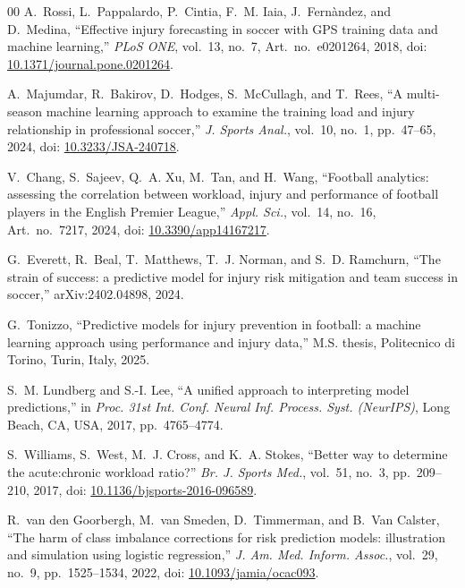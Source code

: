 \documentclass[conference]{IEEEtran}
\newcommand{\doilink}[1]{doi: \href{https://doi.org/#1}{#1}}
\begin{document}
\begin{thebibliography}{00}
A.~Rossi, L.~Pappalardo, P.~Cintia, F.~M. Iaia, J.~Fernàndez, and D.~Medina, ``Effective injury forecasting in soccer with GPS training data and machine learning,'' \textit{PLoS ONE}, vol.~13, no.~7, Art.~no.~e0201264, 2018, \doilink{10.1371/journal.pone.0201264}.

A.~Majumdar, R.~Bakirov, D.~Hodges, S.~McCullagh, and T.~Rees, ``A multi-season machine learning approach to examine the training load and injury relationship in professional soccer,'' \textit{J. Sports Anal.}, vol.~10, no.~1, pp.~47--65, 2024, \doilink{10.3233/JSA-240718}.

V.~Chang, S.~Sajeev, Q.~A. Xu, M.~Tan, and H.~Wang, ``Football analytics: assessing the correlation between workload, injury and performance of football players in the English Premier League,'' \textit{Appl. Sci.}, vol.~14, no.~16, Art.~no.~7217, 2024, \doilink{10.3390/app14167217}.

G.~Everett, R.~Beal, T.~Matthews, T.~J. Norman, and S.~D. Ramchurn, ``The strain of success: a predictive model for injury risk mitigation and team success in soccer,'' arXiv:2402.04898, 2024.

G.~Tonizzo, ``Predictive models for injury prevention in football: a machine learning approach using performance and injury data,'' M.S. thesis, Politecnico di Torino, Turin, Italy, 2025.

S.~M. Lundberg and S.-I. Lee, ``A unified approach to interpreting model predictions,'' in \textit{Proc. 31st Int. Conf. Neural Inf. Process. Syst. (NeurIPS)}, Long Beach, CA, USA, 2017, pp.~4765--4774.

S.~Williams, S.~West, M.~J. Cross, and K.~A. Stokes, ``Better way to determine the acute:chronic workload ratio?'' \textit{Br. J. Sports Med.}, vol.~51, no.~3, pp.~209--210, 2017, \doilink{10.1136/bjsports-2016-096589}.

R.~van den Goorbergh, M.~van Smeden, D.~Timmerman, and B.~Van Calster, ``The harm of class imbalance corrections for risk prediction models: illustration and simulation using logistic regression,'' \textit{J. Am. Med. Inform. Assoc.}, vol.~29, no.~9, pp.~1525--1534, 2022, \doilink{10.1093/jamia/ocac093}.

\end{thebibliography}
\end{document}
